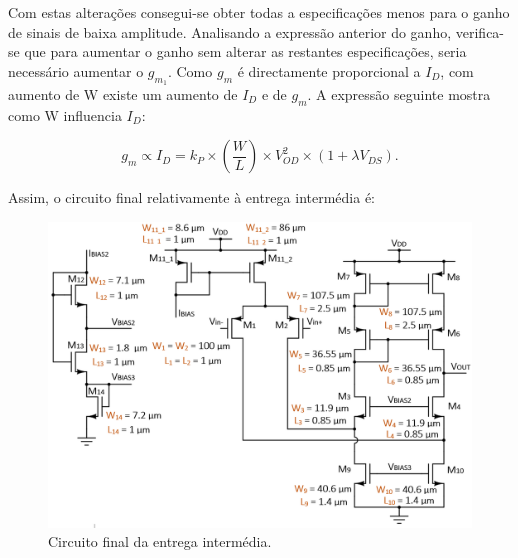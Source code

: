 \documentclass[11pt]{article}
\numberwithin{equation}{section}
\begin{document}
Com estas alterações consegui-se obter todas a especificações menos para o ganho de sinais de baixa amplitude. Analisando a expressão anterior do ganho, verifica-se que para aumentar o ganho sem alterar as restantes especificações, seria necessário aumentar o $g_{m_1}$. Como $g_m$ é directamente proporcional a $I_D$, com aumento de W existe um aumento de $I_D$ e de $g_m$. A expressão seguinte mostra como W influencia $I_D$:

\vspace{-3mm}
\begin{equation}
g_{m} \propto I_{D}= k_P \times \left(\frac{W}{L}\right) \times V_{OD}^2 \times \left(1+\lambda V_{DS}\right).
\end{equation}



Assim, o circuito final relativamente à entrega intermédia é:

\begin{figure}[H]
	\centering
	\includegraphics[keepaspectratio=true, scale=0.42]{teoricas/circuitoantesdadiv}
	\vspace{-0.5em}
	\caption{Circuito final da entrega intermédia.}
	\vspace{-0.8em}
	\label{fig:finalint}
\end{figure} 
\end{document}
